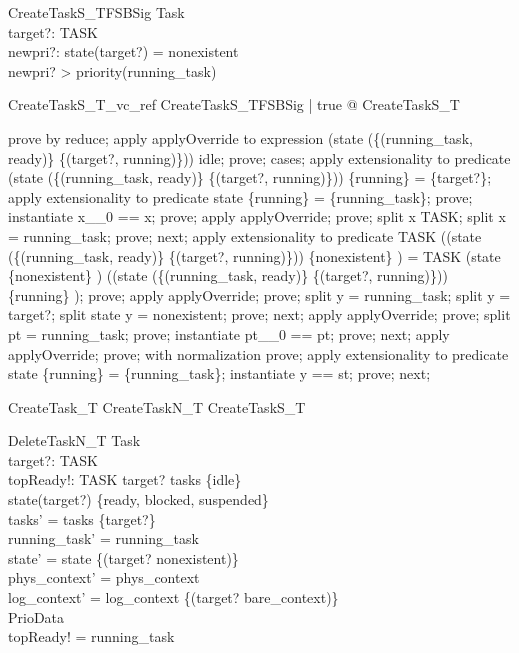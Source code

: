 \documentclass[a4paper, 12pt]{article}
\begin{document}
\begin{schema}{CreateTaskS\_TFSBSig}
  Task\\
  target?: TASK \\
  newpri?: \nat
\where
  state(target?) = nonexistent\\
  newpri? > priority(running\_task)
\end{schema}

\begin{theorem}{CreateTaskS\_T\_vc\_ref}
\forall  CreateTaskS\_TFSBSig | true @ \pre  CreateTaskS\_T
\end{theorem}

\begin{zproof}
prove by reduce;
apply applyOverride to expression (state \oplus  (\{(running\_task, ready)\} \cup  \{(target?, running)\})) idle;
prove;
cases;
apply extensionality to predicate (state \oplus  (\{(running\_task, ready)\} \cup  \{(target?, running)\})) \inv  \limg  \{running\} \rimg  = \{target?\};
apply extensionality to predicate state \inv  \limg  \{running\} \rimg  = \{running\_task\};
prove;
instantiate x\_\_0 == x;
prove;
apply applyOverride;
prove;
split x \in  TASK;
split x = running\_task;
prove;
next;
apply extensionality to predicate TASK \setminus  ((state \oplus  (\{(running\_task, ready)\} \cup  \{(target?, running)\})) \inv  \limg  \{nonexistent\} \rimg ) = TASK \setminus  (state \inv  \limg  \{nonexistent\} \rimg ) \cup  ((state \oplus  (\{(running\_task, ready)\} \cup  \{(target?, running)\})) \inv  \limg  \{running\} \rimg );
prove;
apply applyOverride;
prove;
split y = running\_task;
split y = target?;
split \lnot  state y = nonexistent;
prove;
next;
apply applyOverride;
prove;
split pt = running\_task;
prove;
instantiate pt\_\_0 == pt;
prove;
next;
apply applyOverride;
prove;
with normalization prove;
apply extensionality to predicate state \inv  \limg  \{running\} \rimg  = \{running\_task\};
instantiate y == st;
prove;
next;
\end{zproof}

\begin{zed}
CreateTask\_T  CreateTaskN\_T \lor  CreateTaskS\_T
\end{zed}

\begin{schema}{DeleteTaskN\_T}
  \Delta Task\\
  target?: TASK\\
  topReady!: TASK
\where
  target? \in  tasks \setminus  \{idle\}\\
  state(target?) \in  \{ready, blocked, suspended\}\\
  tasks' = tasks \setminus  \{target?\}\\
  running\_task' = running\_task\\
  state' = state \oplus  \{(target? \mapsto  nonexistent)\}\\
  phys\_context' = phys\_context\\
  log\_context' = log\_context \oplus  \{(target? \mapsto  bare\_context)\}\\
  \Xi PrioData\\
  topReady! = running\_task
\end{schema}
\end{document}

